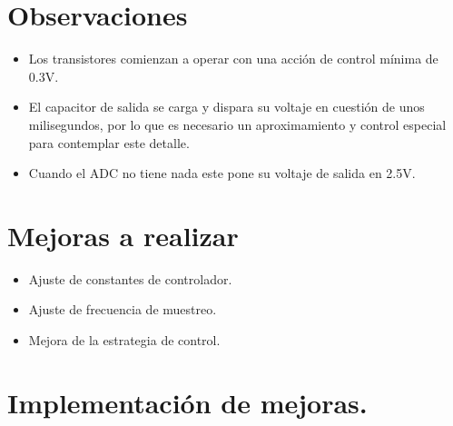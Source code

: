 \section*{Observaciones}
\begin{itemize}
    \item Los transistores comienzan a operar con una acción de control mínima de 0.3V.
    \item El capacitor de salida se carga y dispara su voltaje en cuestión de unos milisegundos, por lo que es necesario un aproximamiento y control especial para contemplar este detalle.
    \item Cuando el ADC no tiene nada este pone su voltaje de salida en 2.5V.
\end{itemize}

\section*{Mejoras a realizar}
\begin{itemize}
    \item Ajuste de constantes de controlador.
    \item Ajuste de frecuencia de muestreo.
    \item Mejora de la estrategia de control.
\end{itemize}

\section{Implementación de mejoras.}
